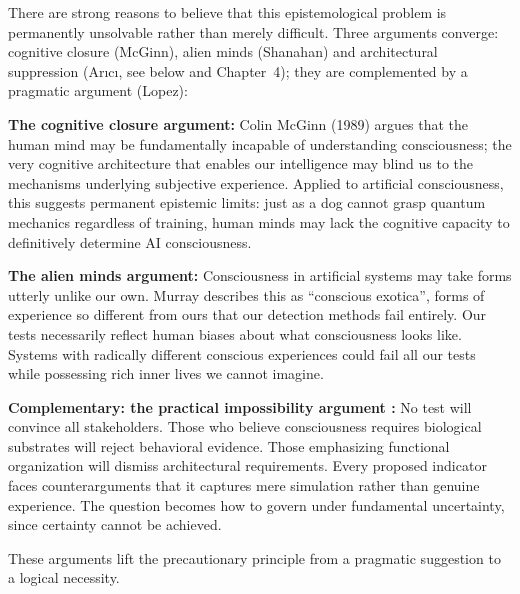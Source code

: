 \documentclass[acmlarge, nonacm]{acmart}
\begin{document}
There are strong reasons to believe that this epistemological problem is permanently unsolvable rather than merely difficult. Three arguments converge: cognitive closure (McGinn), alien minds (Shanahan) and architectural suppression (Ar{\i}c{\i}, see below and Chapter~4); they are complemented by a pragmatic argument (Lopez):

\textbf{The cognitive closure argument:} Colin McGinn (1989) argues that the human mind may be fundamentally incapable of understanding consciousness; the very cognitive architecture that enables our intelligence may blind us to the mechanisms underlying subjective experience. Applied to artificial consciousness, this suggests permanent epistemic limits: just as a dog cannot grasp quantum mechanics regardless of training, human minds may lack the cognitive capacity to definitively determine AI consciousness.

\textbf{The alien minds argument:} Consciousness in artificial systems may take forms utterly unlike our own. Murray \cite{shanahan2024} describes this as ``conscious exotica'', forms of experience so different from ours that our detection methods fail entirely. Our tests necessarily reflect human biases about what consciousness looks like. Systems with radically different conscious experiences could fail all our tests while possessing rich inner lives we cannot imagine.

\textbf{Complementary: the practical impossibility argument \cite{lopez2025}:} No test will convince all stakeholders. Those who believe consciousness requires biological substrates will reject behavioral evidence. Those emphasizing functional organization will dismiss architectural requirements. Every proposed indicator faces counterarguments that it captures mere simulation rather than genuine experience. The question becomes how to govern under fundamental uncertainty, since certainty cannot be achieved.

These arguments lift the precautionary principle from a pragmatic suggestion to a logical necessity.
\end{document}
